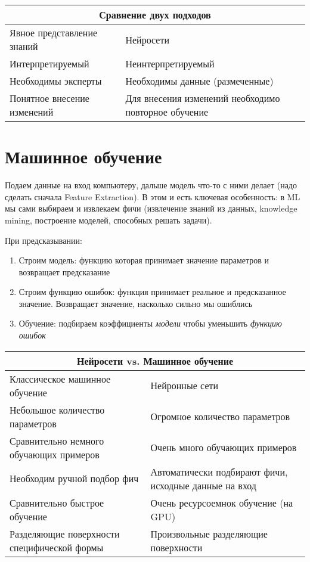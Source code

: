 \documentclass[14pt]{extarticle}
\begin{document}
\begin{center}
    \begin{tabularx}{\textwidth}{|l|X|}
        \multicolumn{2}{c}{Сравнение двух подходов}\\\hline
        Явное представление знаний & Нейросети \\\hline
        Интерпретируемый & Неинтерпретируемый \\\hline
        Необходимы эксперты & Необходимы данные (размеченные) \\\hline
        Понятное внесение изменений & Для внесения изменений необходимо
        повторное обучение \\\hline
    \end{tabularx}
\end{center}

\section{Машинное обучение}
\par Подаем данные на вход компьютеру, дальше модель что-то с ними делает (надо
сделать сначала Feature Extraction). В этом и есть ключевая особенность: в ML мы
сами выбираем и извлекаем фичи (извлечение знаний из данных, knowledge mining,
построение моделей, способных решать задачи).
\par При предсказывании:
\begin{enumerate}
    \item Строим модель: функцию которая принимает значение параметров и
        возвращает предсказание
    \item Строим функцию ошибок: функция принимает реальное и предсказанное
        значение. Возвращает значение, насколько сильно мы ошиблись
    \item Обучение: подбираем коэффициенты \textit{модели} чтобы уменьшить
        \textit{функцию ошибок}
\end{enumerate}

\begin{center}
    \begin{tabularx}{\textwidth}{|X|X|}
        \multicolumn{2}{c}{Нейросети vs. Машинное обучение}\\\hline
        Классическое машинное обучение & Нейронные сети \\\hline
        Небольшое количество параметров & Огромное количество параметров \\\hline
        Сравнительно немного обучающих примеров & Очень много обучающих
        примеров \\\hline
        Необходим ручной подбор фич & Автоматически подбирают фичи, исходные
        данные на вход \\\hline
        Сравнительно быстрое обучение & Очень ресурсоемнок обучение (на GPU) \\\hline
        Разделяющие поверхности специфической формы & Произвольные разделяющие
        поверхности \\\hline
    \end{tabularx}
\end{center}
\end{document}
